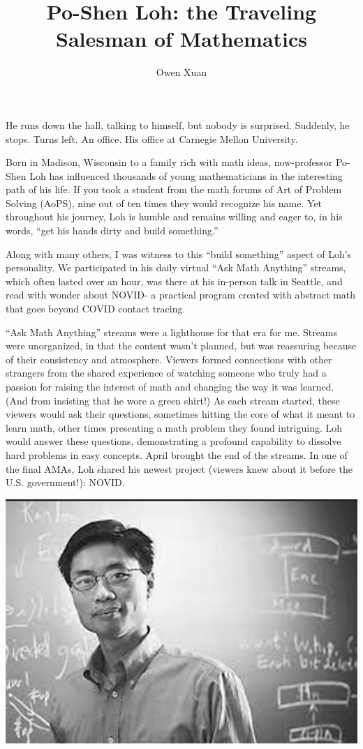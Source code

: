 \documentclass{article}
\title{Po-Shen Loh: the Traveling Salesman of Mathematics}
\author{Owen Xuan}
\begin{document}
\maketitle
He runs down the hall, talking to himself, but nobody is surprised. Suddenly, he stops. Turns left. An office. His office at Carnegie Mellon University.

Born in Madison, Wisconsin to a family rich with math ideas, now-professor Po-Shen Loh has influenced thousands of young mathematicians in the interesting path of his life. If you took a student from the math forums of Art of Problem Solving (AoPS), nine out of ten times they would recognize his name.  Yet throughout his journey, Loh is humble and remains willing and eager to, in his words, “get his hands dirty and build something.”

Along with many others, I was witness to this “build something” aspect of Loh’s personality. We participated in his daily virtual “Ask Math Anything” streams, which often lasted over an hour, was there at his in-person talk in Seattle, and read with wonder about NOVID- a practical program created with abstract math that goes beyond COVID contact tracing.

“Ask Math Anything” streams were a lighthouse for that era for me. Streams were unorganized, in that the content wasn’t planned, but was reassuring because of their consistency and atmosphere. Viewers formed connections with other strangers from the shared experience of watching someone who truly had a passion for raising the interest of math and changing the way it was learned. (And from insisting that he wore a green shirt!) As each stream started, these viewers would ask their questions, sometimes hitting the core of what it meant to learn math, other times presenting a math problem they found intriguing. Loh would answer these questions, demonstrating a profound capability to dissolve hard problems in easy concepts. April brought the end of the streams. In one of the final AMAs, Loh shared his newest project (viewers knew about it before the U.S. government!): NOVID.
\begin{center}
    \includegraphics[scale=0.35]{images/po-shen loh.png}
\end{center}
\end{document}
